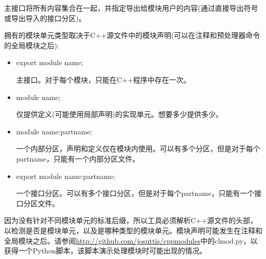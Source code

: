 主接口将所有内容集合在一起，并指定导出给模块用户的内容(通过直接导出符号或导出导入的接口分区)。

拥有的模块单元类型取决于C++源文件中的模块声明(可以在注释和预处理器命令的全局模块之后):

\begin{itemize}
\item
export module name;

主接口。对于每个模块，只能在C++程序中存在一次。

\item
module name;

仅提供定义(可能使用局部声明)的实现单元。想要多少提供多少。

\item
module name:partname;

一个内部分区，声明和定义仅在模块内使用。可以有多个分区，但是对于每个partname，只能有一个内部分区文件。

\item
export module name:partname;

一个接口分区。可以有多个接口分区，但是对于每个partname，只能有一个接口分区文件。
\end{itemize}

因为没有针对不同模块单元的标准后缀，所以工具必须解析C++源文件的头部，以检测是否是模块单元，以及是哪种类型的模块单元。模块声明可能发生在注释和全局模块之后。请参阅\url{http://github.com/josuttis/cppmodules}中的clmod.py，以获得一个Python脚本，该脚本演示处理模块时可能出现的情况。






